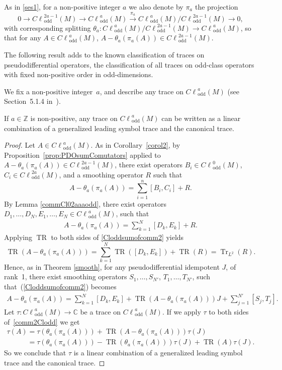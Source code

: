 \documentclass[pdftex]{sigma}
\DeclareMathOperator{\TR}{TR} \DeclareMathOperator{\Op}{Op}
\DeclareMathOperator{\Tr}{Tr} \DeclareMathOperator{\ord}{ord}
\DeclareMathOperator{\odd}{odd} \DeclareMathOperator{\supp}{supp}
\newcommand{\C}{{\mathbb C}}
\newcommand{\Z}{{\mathbb Z}}
\def \Cl {{C\ell}}
\begin{document}
As in \eqref{ses1}, for a non-positive integer $a$ we also denote by $\pi_a$ the projection
\[
0\to \Cl^{2a-1}_{\odd}(M)\to \Cl^{a}_{\odd}(M)\overset{\pi_a}{\to}\Cl^{a}_{\odd}(M)/\Cl^{2a-1}_{\odd}(M)\to0,
\]
with corresponding splitting $\theta_a:\Cl^{a}_{\odd}(M)/\Cl^{2a-1}_{\odd}(M)\to \Cl^{a}_{\odd}(M)$, so that for any $A\in \Cl^{a}_{\odd}(M)$, $A-\theta_a(\pi_a(A))\in \Cl^{2a-1}_{\odd}(M)$.

The following result adds to the known classif\/ication of traces on pseudodif\/ferential ope\-ra\-tors, the classif\/ication of all traces on odd-class operators with f\/ixed non-positive order in odd-dimensions.

We f\/ix a non-positive integer~$a$, and describe any trace on $\Cl^{a}_{\odd}(M)$ (see Section~5.1.4 in~\cite{neirathesis}).

\begin{theorem}\label{classifictracesClodda}
If $a\in\Z$ is non-positive, any trace on $\Cl^{a}_{\odd}(M)$ can be written as a linear combination of a generalized leading symbol trace and the canonical trace.
\end{theorem}

\begin{proof}
Let $A\in \Cl^{a}_{\odd}(M)$. As in Corollary~\ref{corol2}, by Proposition~\ref{prop:PDOsumComutators} applied to $A-\theta_a(\pi_a(A))\in \Cl^{2a-1}_{\odd}(M)$, there exist operators $B_i\in \Cl^{0}_{\odd}(M)$, $C_i\in \Cl^{2a}_{\odd}(M)$, and a smoothing operator $R$ such that
\[
A-\theta_a(\pi_a(A))=\sum\limits_{i=1}^n[B_i,C_i]+R.
\]
By Lemma \ref{commCl02aaaodd}, there exist operators $D_1,\ldots,D_N,E_1,\ldots,E_N\in \Cl^{a}_{\odd}(M)$, such that
\begin{gather}
A-\theta_a(\pi_a(A))=\sum\limits_{k=1}^N[D_k,E_k]+R. \label{Cloddsumofcomm2}
\end{gather}
Applying $\TR$ to both sides of \eqref{Cloddsumofcomm2} yields
\[
\TR(A-\theta_a(\pi_a(A)))=\sum\limits_{k=1}^N\TR([D_k,E_k])+\TR(R)=\Tr_{L^2}(R).
\]
Hence, as in Theorem \ref{smooth}, for any pseudodif\/ferential idempotent $J$, of rank~1, there exist smoothing operators $S_1,\ldots,S_{N'}$, $T_1,\ldots,T_{N'}$, such that~(\ref{Cloddsumofcomm2}) becomes
\begin{gather}
A-\theta_a(\pi_a(A))=\sum_{k=1}^N[D_k,E_k] + \TR(A-\theta_a(\pi_a(A)))J+\sum_{j=1}^{N'}[S_j,T_j]. \label{comm2Clodd}
\end{gather}
Let $\tau:\Cl^{a}_{\odd}(M)\to\C$ be a trace on $\Cl^{a}_{\odd}(M)$. If we apply $\tau$ to both sides of~\eqref{comm2Clodd} we get
\begin{gather*}
\tau(A) =\tau(\theta_a(\pi_a(A)))+\TR(A-\theta_a(\pi_a(A)))\tau(J) \\
\phantom{\tau(A)}{}  =\tau(\theta_a(\pi_a(A)))-\TR(\theta_a(\pi_a(A)))\tau(J)+\TR(A)\tau(J).
\end{gather*}
So we conclude that $\tau$ is a linear combination of a generalized leading symbol trace and the canonical trace.
\end{proof}
\end{document}
